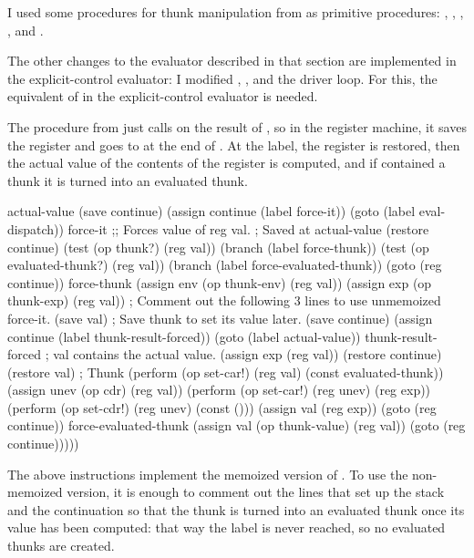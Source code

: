 \begin{exe}[5.25]
    I used some procedures for thunk manipulation from 
     as primitive procedures: , 
    , , ,  
    and .

    The other changes to the evaluator described in that section are implemented 
    in the explicit-control evaluator: I modified , 
    ,  and the driver loop. For this, the 
    equivalent of  in the explicit-control evaluator is 
    needed.

    The  procedure from  
    just calls  on the result of , so in the register 
    machine, it saves the  register and goes to  
    at the end of . At the  label, the 
     register is restored, then the actual value of the contents 
    of the  register is computed, and if  contained a thunk 
    it is turned into an evaluated thunk.
    \begin{cscm}
    actual-value
        (save continue)
        (assign continue (label force-it))
        (goto (label eval-dispatch))
    force-it
        ;; Forces value of reg val.
        ; Saved at actual-value
        (restore continue)
        (test (op thunk?) (reg val))
        (branch (label force-thunk))
        (test (op evaluated-thunk?) (reg val))
        (branch (label force-evaluated-thunk))
        (goto (reg continue))
    force-thunk
        (assign env (op thunk-env) (reg val))
        (assign exp (op thunk-exp) (reg val))
        ; Comment out the following 3 lines to use unmemoized force-it.
        (save val) ; Save thunk to set its value later.
        (save continue)
        (assign continue (label thunk-result-forced))
        (goto (label actual-value))
    thunk-result-forced
        ; val contains the actual value.
        (assign exp (reg val))
        (restore continue)
        (restore val) ; Thunk
        (perform (op set-car!) (reg val) (const evaluated-thunk))
        (assign unev (op cdr) (reg val))
        (perform (op set-car!) (reg unev) (reg exp))
        (perform (op set-cdr!) (reg unev) (const ()))
        (assign val (reg exp))
        (goto (reg continue))
    force-evaluated-thunk
        (assign val (op thunk-value) (reg val))
        (goto (reg continue)))))
    \end{cscm}
    The above instructions implement the memoized version of . To 
    use the non-memoized version, it is enough to comment out the lines that set 
    up the stack and the continuation so that the thunk is turned into an 
    evaluated thunk once its value has been computed: that way the 
     label is never reached, so no evaluated thunks 
    are created.


\end{exe}
